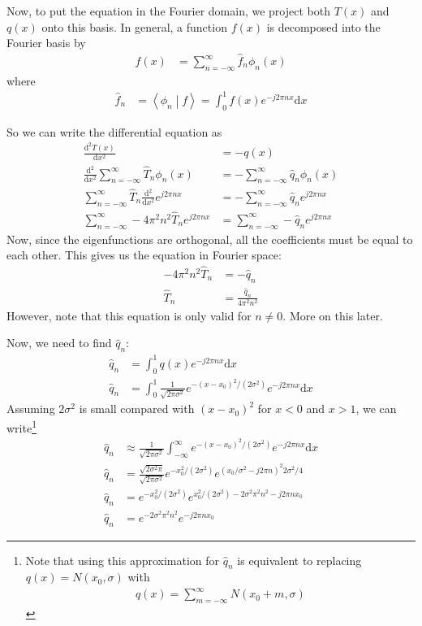 \documentclass[twocolumn]{myarticle}
\renewcommand{\d}{\mathrm{d}}
\begin{document}
Now, to put the equation in the Fourier domain, we project both $ T(x) $ and $ q(x) $ onto this basis.
In general, a function $ f(x) $ is decomposed into the Fourier basis by
\begin{align}
    f(x) &= \sum_{n = -\infty}^{\infty} \hat{f}_n \phi_n(x)
\end{align}
where
\begin{align}
    \hat{f}_n &= \left\langle \phi_n \middle| f \right\rangle = \int_0^1 f(x) e^{-j 2 \pi n x} \d x
\end{align}

So we can write the differential equation as
\begin{align}
    \frac{\d^2 T(x)}{\d x^2} &= - q(x)
    \\
    \frac{\d^2}{\d x^2} \sum_{n = -\infty}^{\infty} \hat{T}_n \phi_n(x) &= -\sum_{n=-\infty}^{\infty} \hat{q}_n \phi_n(x)
    \\
    \sum_{n = -\infty}^{\infty} \hat{T}_n \frac{\d^2}{\d x^2} e^{j 2 \pi n x} &= -\sum_{n=-\infty}^{\infty} \hat{q}_n e^{j 2 \pi n x}
    \\
    \sum_{n = -\infty}^{\infty} - 4 \pi^2 n^2 \hat{T}_n e^{j 2 \pi n x} &= \sum_{n=-\infty}^{\infty} -\hat{q}_n e^{j 2 \pi n x}
\end{align}
Now, since the eigenfunctions are orthogonal, all the coefficients must be equal to each other.
This gives us the equation in Fourier space:
\begin{align}
    - 4 \pi^2 n^2 \hat{T}_n &= - \hat{q}_n \label{eq:fourier_de1}
    \\
    \hat{T}_n &= \frac{\hat{q}_n}{4 \pi^2 n^2}
\end{align}
However, note that this equation is only valid for $ n \neq 0 $.
More on this later.

Now, we need to find $ \hat{q}_n $:
\begin{align}
    \hat{q}_n &= \int_{0}^{1} q(x) e^{-j 2 \pi n x} \d x
    \\
    \hat{q}_n &= \int_{0}^{1} \frac{1}{\sqrt{2 \pi \sigma^2}} e^{-(x - x_0)^2/(2 \sigma^2)} e^{-j 2 \pi n x} \d x
\end{align}
Assuming $ 2 \sigma^2 $ is small compared with $ (x - x_0)^2 $ for $ x < 0 $ and $ x > 1 $, we can write\footnote{Note that using this approximation for $ \hat{q}_n $ is equivalent to replacing $ q(x) = N(x_0, \sigma) $ with \begin{align}q(x) = \sum_{m=-\infty}^{\infty} N(x_0 + m, \sigma) \nonumber \end{align}}
\begin{align}
    \hat{q}_n &\approx \frac{1}{\sqrt{2 \pi \sigma^2}} \int_{-\infty}^{\infty} e^{-(x - x_0)^2/(2 \sigma^2)} e^{-j 2 \pi n x} \d x
    \\
    \hat{q}_n &= \frac{\sqrt{2 \sigma^2 \pi}}{\sqrt{2 \pi \sigma^2}} e^{-x_0^2/(2\sigma^2)} e^{(x_0/\sigma^2 - j 2 \pi n  )^2 2 \sigma^2 / 4}
    \\
    \hat{q}_n &= e^{-x_0^2/(2\sigma^2)} e^{x_0^2/(2\sigma^2) - 2 \sigma^2 \pi^2 n^2 - j 2 \pi n x_0 }
    \\
    \hat{q}_n &= e^{- 2 \sigma^2 \pi^2 n^2} e^{- j 2 \pi n x_0 }
\end{align}
\end{document}
